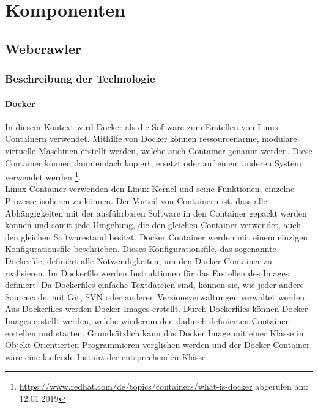 \chapter{Komponenten}
\section{Webcrawler}
\subsection{Beschreibung der Technologie}
\subsubsection{Docker}
In diesem Kontext wird Docker als die Software zum Erstellen von Linux-Containern verwendet.
Mithilfe von Docker können ressourcenarme, modulare virtuelle Maschinen erstellt werden, welche auch Container genannt werden.
Diese Container können dann einfach kopiert, ersetzt oder auf einem anderen System verwendet werden \footnote{\url{https://www.redhat.com/de/topics/containers/what-is-docker} abgerufen am: 12.01.2019}.\\
Linux-Container verwenden den Linux-Kernel und seine Funktionen, einzelne Prozesse isolieren zu können.
Der Vorteil von Containern ist, dass alle Abhängigkeiten mit der ausführbaren Software in den Container gepackt werden können und somit jede Umgebung, die den gleichen Container verwendet, auch den gleichen Softwarestand besitzt.
Docker Container werden mit einem einzigen Konfigurationsfile beschrieben.
Dieses Konfigurationsfile, das sogenannte Dockerfile, definiert alle Notwendigkeiten, um den Docker Container zu realisieren.
Im Dockerfile werden Instruktionen für das Erstellen des Images definiert.
Da Dockerfiles einfache Textdateien sind, können sie, wie jeder andere Sourcecode, mit Git, SVN oder anderen Versionsverwaltungen verwaltet werden.
Aus Dockerfiles werden Docker Images erstellt.
Durch Dockerfiles können Docker Images erstellt werden, welche wiederum den dadurch definierten Container erstellen und starten.
Grundsätzlich kann das Docker Image mit einer Klasse im Objekt-Orientierten-Programmieren verglichen werden und der Docker Container wäre eine laufende Instanz der entsprechenden Klasse. 
